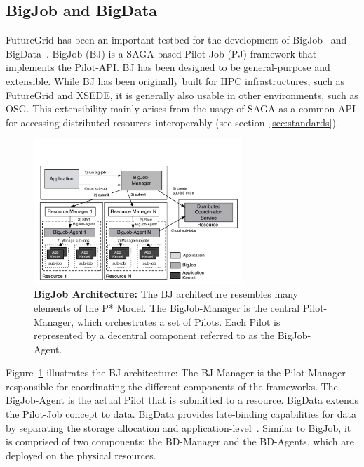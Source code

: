 \documentclass[]{paper}
\begin{document}
\subsection{BigJob and BigData}

FutureGrid has been an important testbed for the development of
BigJob~\cite{saga_bigjob_condor_cloud} and
BigData~\cite{pstar-sc-2012,pmr-2012}. BigJob (BJ) is a SAGA-based Pilot-Job
(PJ) framework that implements the Pilot-API. BJ has been designed to be
general-purpose and extensible. While BJ has been originally built for HPC
infrastructures, such as FutureGrid and XSEDE, it is generally also usable in
other environments, such as OSG. This extensibility mainly arises from the
usage of SAGA as a common API for accessing distributed resources
interoperably (see section~\ref{sec:standards}).

\begin{figure}[t]
	\centering
	\includegraphics[width=0.7\textwidth]{figures/re_bigjob_interactions.pdf}
	\caption{\textbf{BigJob Architecture:} The
	          BJ architecture resembles many elements of the P* Model. The
	          BigJob-Manager is the central Pilot-Manager, which
	          orchestrates a set of Pilots. Each Pilot is represented by a
	          decentral component referred to as the BigJob-Agent.}
			\label{fig:figures_re_bigjob_interactions}
\end{figure}

Figure~\ref{fig:figures_re_bigjob_interactions} illustrates the BJ
architecture: The BJ-Manager is the Pilot-Manager responsible for coordinating
the different components of the frameworks. The BigJob-Agent is the actual
Pilot that is submitted to a resource. BigData extends the Pilot-Job concept
to data. BigData provides late-binding capabilities for data by separating the
storage allocation and application-level~\cite{pstar-2012}. Similar to BigJob,
it is comprised of two components: the BD-Manager and the BD-Agents, which are
deployed on the physical resources.
\end{document}
